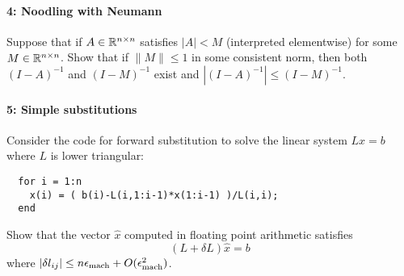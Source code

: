 \documentclass[12pt, leqno]{article} %
\begin{document}
\paragraph*{4: Noodling with Neumann}
Suppose that if $A \in \mathbb{R}^{n \times n}$ satisfies
$|A| < M$ (interpreted elementwise) for some $M \in \mathbb{R}^{n \times n}$.
Show that if $\|M\| \leq 1$ in some consistent norm, then
both $(I-A)^{-1}$ and $(I-M)^{-1}$ exist and
$|(I-A)^{-1}| \leq (I-M)^{-1}$.

\paragraph*{5: Simple substitutions}
Consider the code for forward substitution to solve the linear system
$Lx = b$ where $L$ is lower triangular:
\begin{lstlisting}
  for i = 1:n
    x(i) = ( b(i)-L(i,1:i-1)*x(1:i-1) )/L(i,i);
  end
\end{lstlisting}
Show that the vector $\hat{x}$ computed in floating point arithmetic
satisfies
\[
  (L+\delta L) \hat{x} = b
\]
where $|\delta l_{ij}| \leq n \epsilon_{\mathrm{mach}} + O(\epsilon_{\mathrm{mach}}^2)$.
\end{document}
